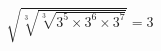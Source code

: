 \documentclass[preview]{standalone}
\begin{document}
\begin{align*}
\sqrt{\sqrt[3]{\sqrt[3]{3^5 \times 3^6 \times 3^7}}} =3
\end{align*}
\end{document}
